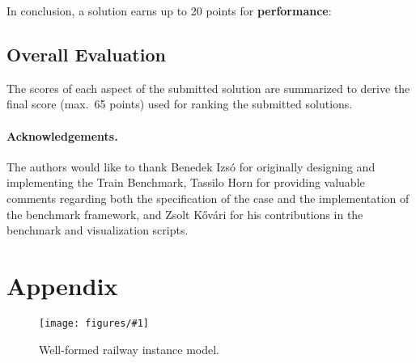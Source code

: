 \documentclass[submission,copyright,creativecommons]{eptcs}
\newcommand{\tb}{Train Benchmark\xspace}
\newcommand{\ttcfig}[2]{
\begin{figure}[htb] 
	\centering
	\texttt{[image: figures/\#1]}
	\caption{#2.}
	\label{fig:#1}
\end{figure}}
\begin{document}
In conclusion, a solution earns up to 20 points for \textbf{performance}:

\noindent{}

\subsection{Overall Evaluation}

The scores of each aspect of the submitted solution are summarized to derive the final score (max.\ 65 points) used for ranking the submitted solutions.

\paragraph{Acknowledgements.} The authors would like to thank Benedek Izsó for originally designing and implementing the \tb, Tassilo Horn for providing  valuable comments regarding both the specification of the case and the implementation of the benchmark framework, and Zsolt Kővári for his contributions in the benchmark and visualization scripts.




\clearpage

\appendix
\section{Appendix}

\ttcfig{railway-yed}{Well-formed railway instance model}
\end{document}
